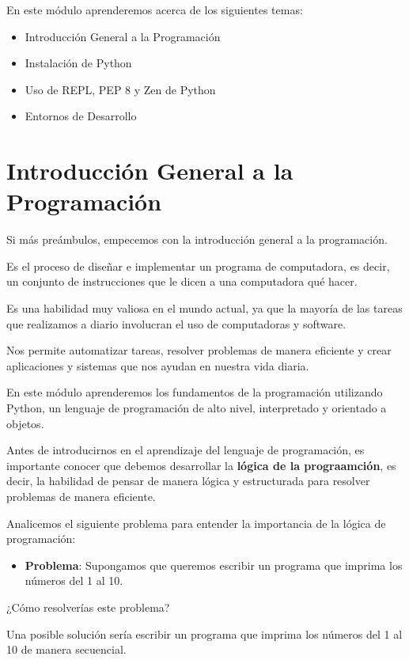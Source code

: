 \documentclass[
  a4paper,
  DIV=11,
  numbers=noendperiod,
  onepage,
  openany]{scrreprt}
\providecommand{\tightlist}{%
  \setlength{\itemsep}{0pt}\setlength{\parskip}{0pt}}\usepackage{longtable,booktabs,array}
\begin{document}
En este módulo aprenderemos acerca de los siguientes temas:

\begin{itemize}
\item
  Introducción General a la Programación
\item
  Instalación de Python
\item
  Uso de REPL, PEP 8 y Zen de Python
\item
  Entornos de Desarrollo
\end{itemize}

\section{Introducción General a la
Programación}\label{introducciuxf3n-general-a-la-programaciuxf3n}

Si más preámbulos, empecemos con la introducción general a la
programación.

Es el proceso de diseñar e implementar un programa de computadora, es
decir, un conjunto de instrucciones que le dicen a una computadora qué
hacer.

Es una habilidad muy valiosa en el mundo actual, ya que la mayoría de
las tareas que realizamos a diario involucran el uso de computadoras y
software.

Nos permite automatizar tareas, resolver problemas de manera eficiente y
crear aplicaciones y sistemas que nos ayudan en nuestra vida diaria.

En este módulo aprenderemos los fundamentos de la programación
utilizando Python, un lenguaje de programación de alto nivel,
interpretado y orientado a objetos.

Antes de introducirnos en el aprendizaje del lenguaje de programación,
es importante conocer que debemos desarrollar la \textbf{lógica de la
prograamción}, es decir, la habilidad de pensar de manera lógica y
estructurada para resolver problemas de manera eficiente.

Analicemos el siguiente problema para entender la importancia de la
lógica de programación:

\begin{itemize}
\tightlist
\item
  \textbf{Problema}: Supongamos que queremos escribir un programa que
  imprima los números del 1 al 10.
\end{itemize}

¿Cómo resolverías este problema?

Una posible solución sería escribir un programa que imprima los números
del 1 al 10 de manera secuencial.
\end{document}
